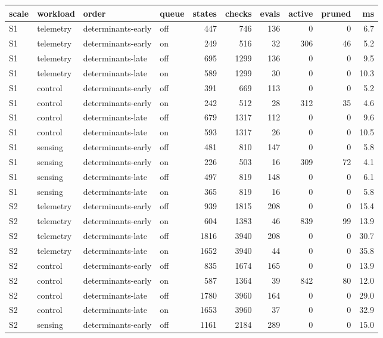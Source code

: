 \scriptsize
\begin{tabular}{llllrrrrrr}
\toprule
scale & workload & order & queue & states & checks & evals & active & pruned & ms \\
\midrule
S1 & telemetry & determinants-early & off & 447 & 746 & 136 & 0 & 0 & 6.7 \\
S1 & telemetry & determinants-early & on & 249 & 516 & 32 & 306 & 46 & 5.2 \\
S1 & telemetry & determinants-late & off & 695 & 1299 & 136 & 0 & 0 & 9.5 \\
S1 & telemetry & determinants-late & on & 589 & 1299 & 30 & 0 & 0 & 10.3 \\
S1 & control & determinants-early & off & 391 & 669 & 113 & 0 & 0 & 5.2 \\
S1 & control & determinants-early & on & 242 & 512 & 28 & 312 & 35 & 4.6 \\
S1 & control & determinants-late & off & 679 & 1317 & 112 & 0 & 0 & 9.6 \\
S1 & control & determinants-late & on & 593 & 1317 & 26 & 0 & 0 & 10.5 \\
S1 & sensing & determinants-early & off & 481 & 810 & 147 & 0 & 0 & 5.8 \\
S1 & sensing & determinants-early & on & 226 & 503 & 16 & 309 & 72 & 4.1 \\
S1 & sensing & determinants-late & off & 497 & 819 & 148 & 0 & 0 & 6.1 \\
S1 & sensing & determinants-late & on & 365 & 819 & 16 & 0 & 0 & 5.8 \\
S2 & telemetry & determinants-early & off & 939 & 1815 & 208 & 0 & 0 & 15.4 \\
S2 & telemetry & determinants-early & on & 604 & 1383 & 46 & 839 & 99 & 13.9 \\
S2 & telemetry & determinants-late & off & 1816 & 3940 & 208 & 0 & 0 & 30.7 \\
S2 & telemetry & determinants-late & on & 1652 & 3940 & 44 & 0 & 0 & 35.8 \\
S2 & control & determinants-early & off & 835 & 1674 & 165 & 0 & 0 & 13.9 \\
S2 & control & determinants-early & on & 587 & 1364 & 39 & 842 & 80 & 12.0 \\
S2 & control & determinants-late & off & 1780 & 3960 & 164 & 0 & 0 & 29.0 \\
S2 & control & determinants-late & on & 1653 & 3960 & 37 & 0 & 0 & 32.9 \\
S2 & sensing & determinants-early & off & 1161 & 2184 & 289 & 0 & 0 & 15.0 \\

\end{tabular}

